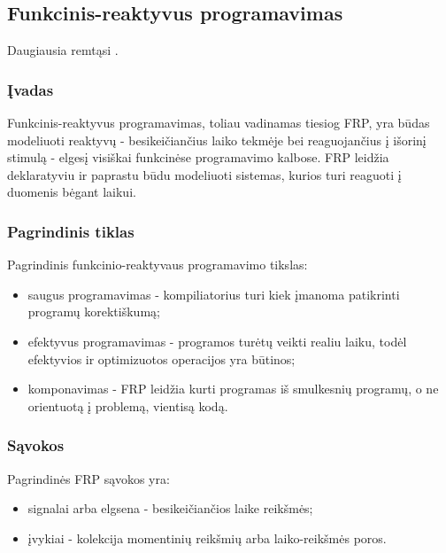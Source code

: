 \subsection{Funkcinis-reaktyvus programavimas}

Daugiausia remtąsi \cite{Survey}.

\subsubsection{Įvadas}

Funkcinis-reaktyvus programavimas, toliau vadinamas tiesiog FRP, yra būdas modeliuoti reaktyvų - besikeičiančius laiko tekmėje bei reaguojančius į išorinį stimulą - elgesį visiškai funkcinėse programavimo kalbose. FRP leidžia deklaratyviu ir paprastu būdu modeliuoti sistemas, kurios turi reaguoti į duomenis bėgant laikui.

\subsubsection{Pagrindinis tiklas}

Pagrindinis funkcinio-reaktyvaus programavimo tikslas:

\begin{itemize}

	\item saugus programavimas - kompiliatorius turi kiek įmanoma patikrinti programų korektiškumą;

	\item efektyvus programavimas - programos turėtų veikti realiu laiku, todėl efektyvios ir optimizuotos operacijos yra būtinos;

	\item komponavimas - FRP leidžia kurti programas iš smulkesnių programų, o ne orientuotą į problemą, vientisą kodą.

\end{itemize}

\subsubsection{Sąvokos}

Pagrindinės FRP sąvokos yra:

\begin{itemize}

	\item signalai arba elgsena - besikeičiančios laike reikšmės;

	\item įvykiai - kolekcija momentinių reikšmių arba laiko-reikšmės poros.

\end{itemize}

